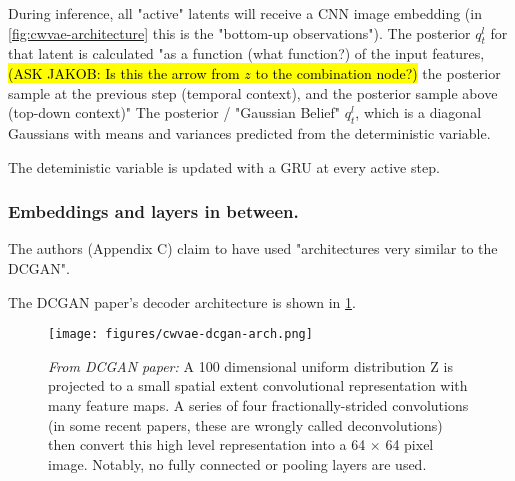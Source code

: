 During inference, all "active" latents will receive a CNN image embedding (in \cref{fig:cwvae-architecture} this is the "bottom-up observations").
The posterior \(q^l_t\) for that latent is calculated 
"as a function (what function?) of the input features, 
\hl{(ASK JAKOB: Is this the arrow from $z$ to the combination node?) } 
the posterior sample at the previous step (temporal context), 
and the posterior sample above (top-down context)"
The posterior / "Gaussian Belief" \(q^l_t\), which is a diagonal Gaussians with means and variances predicted from the deterministic variable.


The deteministic variable is updated with a GRU at every active step.

\subsubsection{Embeddings and layers in between.}

The authors (Appendix C) claim to have used "architectures very similar to the DCGAN".

The DCGAN paper's decoder architecture is shown in \cref{fig:cwvae-dcgan-arch}. \cite{radford_unsupervised_2016}

\begin{figure}[hb]
    \begin{small}
        \begin{center}
            \texttt{[image: figures/cwvae-dcgan-arch.png]}
        \end{center}
        \caption{\textit{From DCGAN paper: }
        A 100 dimensional uniform distribution Z is projected to a small spatial extent convolutional representation with many feature maps.
        A series of four fractionally-strided convolutions (in some recent papers, these are wrongly called
        deconvolutions) then convert this high level representation into a 64 × 64 pixel image. Notably, no
        fully connected or pooling layers are used.}
        \label{fig:cwvae-dcgan-arch}
    \end{small}
\end{figure}


